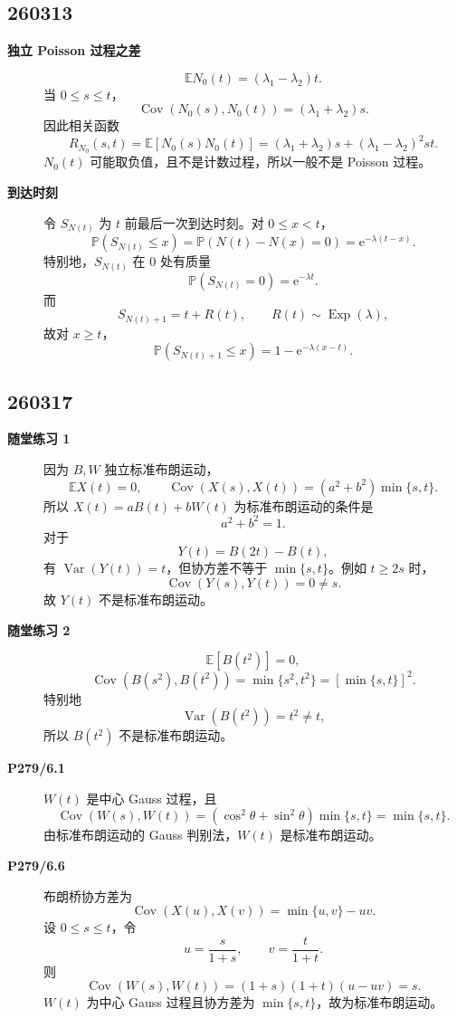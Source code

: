 \documentclass[12pt,a4paper,openany]{ctexrep}
\theoremstyle{definition}
\newcommand{\E}{\mathbb{E}}
\newcommand{\Var}{\operatorname{Var}}
\newcommand{\Cov}{\operatorname{Cov}}
\newcommand{\Pp}{\mathbb{P}}
\newcommand{\Exp}{\operatorname{Exp}}
\newcommand{\e}{\mathrm{e}}
\begin{document}
\subsection*{260313}

\begin{description}
	\item[\textbf{独立 Poisson 过程之差}]
	\[
	\E N_0(t)=(\lambda_1-\lambda_2)t.
	\]
	当 $0\le s\le t$，
	\[
	\Cov(N_0(s),N_0(t))=(\lambda_1+\lambda_2)s.
	\]
	因此相关函数
	\[
	R_{N_0}(s,t)=\E[N_0(s)N_0(t)]
	=(\lambda_1+\lambda_2)s+(\lambda_1-\lambda_2)^2st.
	\]
	$N_0(t)$ 可能取负值，且不是计数过程，所以一般不是 Poisson 过程。
	\item[\textbf{到达时刻}]
	令 $S_{N(t)}$ 为 $t$ 前最后一次到达时刻。对 $0\le x<t$，
	\[
	\Pp(S_{N(t)}\le x)=\Pp(N(t)-N(x)=0)=\e^{-\lambda(t-x)}.
	\]
	特别地，$S_{N(t)}$ 在 $0$ 处有质量
	\[
	\Pp(S_{N(t)}=0)=\e^{-\lambda t}.
	\]
	而
	\[
	S_{N(t)+1}=t+R(t),\qquad R(t)\sim\Exp(\lambda),
	\]
	故对 $x\ge t$，
	\[
	\Pp(S_{N(t)+1}\le x)=1-\e^{-\lambda(x-t)}.
	\]
\end{description}

\subsection*{260317}

\begin{description}
	\item[\textbf{随堂练习 1}]
	因为 $B,W$ 独立标准布朗运动，
	\[
	\E X(t)=0,\qquad
	\Cov(X(s),X(t))=(a^2+b^2)\min\{s,t\}.
	\]
	所以 $X(t)=aB(t)+bW(t)$ 为标准布朗运动的条件是
	\[
	a^2+b^2=1.
	\]
	对于
	\[
	Y(t)=B(2t)-B(t),
	\]
	有 $\Var(Y(t))=t$，但协方差不等于 $\min\{s,t\}$。例如 $t\ge2s$ 时，
	\[
	\Cov(Y(s),Y(t))=0\ne s.
	\]
	故 $Y(t)$ 不是标准布朗运动。
	\item[\textbf{随堂练习 2}]
	\[
	\E[B(t^2)]=0,
	\]
	\[
	\Cov(B(s^2),B(t^2))=\min\{s^2,t^2\}=[\min\{s,t\}]^2.
	\]
	特别地
	\[
	\Var(B(t^2))=t^2\ne t,
	\]
	所以 $B(t^2)$ 不是标准布朗运动。
	\item[\textbf{P279/6.1}]
	$W(t)$ 是中心 Gauss 过程，且
	\[
	\Cov(W(s),W(t))
	=
	(\cos^2\theta+\sin^2\theta)\min\{s,t\}
	=
	\min\{s,t\}.
	\]
	由标准布朗运动的 Gauss 判别法，$W(t)$ 是标准布朗运动。
	\item[\textbf{P279/6.6}]
	布朗桥协方差为
	\[
	\Cov(X(u),X(v))=\min\{u,v\}-uv.
	\]
	设 $0\le s\le t$，令
	\[
	u=\frac{s}{1+s},\qquad v=\frac{t}{1+t}.
	\]
	则
	\[
	\Cov(W(s),W(t))
	=(1+s)(1+t)(u-uv)=s.
	\]
	$W(t)$ 为中心 Gauss 过程且协方差为 $\min\{s,t\}$，故为标准布朗运动。
\end{description}
\end{document}
